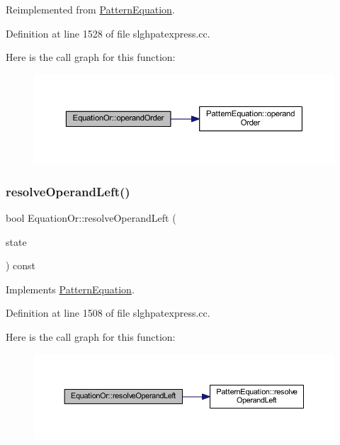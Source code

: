 Reimplemented from \mbox{\hyperlink{class_pattern_equation_a944d7114e5d5b6876352e555cc060829}{Pattern\+Equation}}.



Definition at line 1528 of file slghpatexpress.\+cc.

Here is the call graph for this function\+:
\nopagebreak
\begin{figure}[H]
\begin{center}
\leavevmode
\includegraphics[width=350pt]{class_equation_or_a03a072384883e49f46825d1227872189_cgraph}
\end{center}
\end{figure}
\mbox{\label{class_equation_or_adcdf8650d37644bf0e43a9a0c38ddd7c}} 
\subsubsection{\texorpdfstring{resolveOperandLeft()}{resolveOperandLeft()}}
{\footnotesize\ttfamily bool Equation\+Or\+::resolve\+Operand\+Left (\begin{DoxyParamCaption}\item[{\mbox{\hyperlink{struct_operand_resolve}{Operand\+Resolve}} \&}]{state }\end{DoxyParamCaption}) const\hspace{0.3cm}{\ttfamily [virtual]}}



Implements \mbox{\hyperlink{class_pattern_equation_a16e885a945df91e3daf2dea6394ae6f2}{Pattern\+Equation}}.



Definition at line 1508 of file slghpatexpress.\+cc.

Here is the call graph for this function\+:
\nopagebreak
\begin{figure}[H]
\begin{center}
\leavevmode
\includegraphics[width=350pt]{class_equation_or_adcdf8650d37644bf0e43a9a0c38ddd7c_cgraph}
\end{center}
\end{figure}


